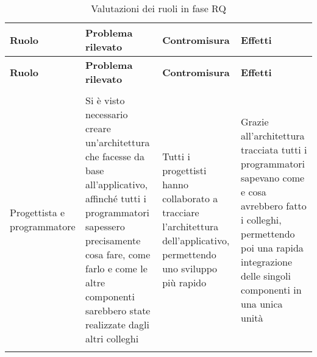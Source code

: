 \documentclass[../piano_di_qualifica.tex]{subfiles}
\begin{document}
\begin{center}
	\begin{longtable}{|p{2.5cm}|p{4.5cm}|p{4.5cm}|p{4.5cm}|}
		\hline
		\rowcolor{lightgray}
		{\textbf{Ruolo}} & {\textbf{Problema rilevato}} & {\textbf{Contromisura}} & {\textbf{Effetti}}  \\
		\hline
		\endfirsthead
		\hline
		\rowcolor{lightgray}
		{\textbf{Ruolo}} & {\textbf{Problema rilevato}} & {\textbf{Contromisura}} & {\textbf{Effetti}} \\
		\hline
		\endhead

		\hline
		\rowcolor{white}
		\multicolumn{3}{|c|}{\emph{Continua alla pagina successiva...}} \\
		\hline
		\endfoot
		\endlastfoot

		Progettista e programmatore & Si è visto necessario creare un'architettura che facesse da base all’applicativo, affinché tutti i programmatori sapessero precisamente cosa fare, come farlo e come le altre componenti sarebbero state realizzate dagli altri colleghi & Tutti i progettisti hanno collaborato a tracciare l’architettura dell’applicativo, permettendo uno sviluppo più rapido & Grazie all’architettura tracciata tutti i programmatori sapevano come e cosa avrebbero fatto i colleghi, permettendo poi una rapida integrazione delle singoli componenti in una unica unità  \\

		\hline
		\rowcolor{white}
		\caption{Valutazioni dei ruoli in fase RQ}
	\end{longtable}
\end{center}
\end{document}
